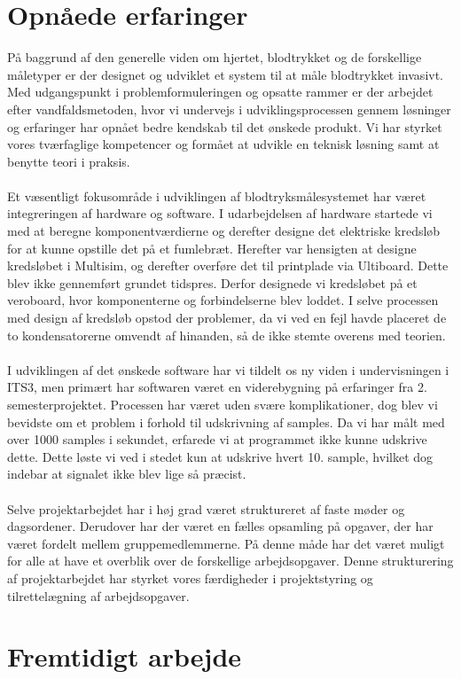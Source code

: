 \section{Opnåede erfaringer}
På baggrund af den generelle viden om hjertet, blodtrykket og de forskellige måletyper er der designet og udviklet et system til at måle blodtrykket invasivt. Med udgangspunkt i problemformuleringen og opsatte rammer er der arbejdet efter vandfaldsmetoden, hvor vi undervejs i udviklingsprocessen gennem løsninger og erfaringer har opnået bedre kendskab til det ønskede produkt. Vi har styrket vores tværfaglige kompetencer og formået at udvikle en teknisk løsning samt at benytte teori i praksis.\\\\
Et væsentligt fokusområde i udviklingen af blodtryksmålesystemet har været integreringen af hardware og software. I udarbejdelsen af hardware startede vi med at beregne komponentværdierne og derefter designe det elektriske kredsløb for at kunne opstille det på et fumlebræt. Herefter var hensigten at designe kredsløbet i Multisim, og derefter overføre det til printplade via Ultiboard. Dette blev ikke gennemført grundet tidspres. Derfor designede vi kredsløbet på et veroboard, hvor komponenterne og forbindelserne blev loddet. I selve processen med design af kredsløb opstod der problemer, da vi ved en fejl havde placeret de to kondensatorerne omvendt af hinanden, så de ikke stemte overens med teorien. \\\\
I udviklingen af det ønskede software har vi tildelt os ny viden i undervisningen i ITS3, men primært har softwaren været en viderebygning på erfaringer fra 2. semesterprojektet. Processen har været uden svære komplikationer, dog blev vi bevidste om et problem i forhold til udskrivning af samples. Da vi har målt med over 1000 samples i sekundet, erfarede vi at programmet ikke kunne udskrive dette. Dette løste vi ved i stedet kun at udskrive hvert 10. sample, hvilket dog indebar at signalet ikke blev lige så præcist. \\\\ 
Selve projektarbejdet har i høj grad været struktureret af faste møder og dagsordener. Derudover har der været en fælles opsamling på opgaver, der har været fordelt mellem gruppemedlemmerne. På denne måde har det været muligt for alle at have et overblik over de forskellige arbejdsopgaver. Denne strukturering af projektarbejdet har styrket vores færdigheder i projektstyring og tilrettelægning af arbejdsopgaver.


\section{Fremtidigt arbejde}


